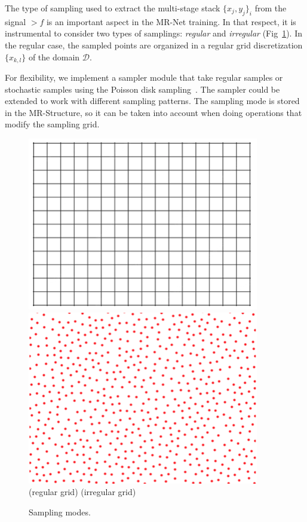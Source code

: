 The type of sampling used to extract the multi-stage stack $\{x_j, y_j\}_i$ from the signal $\gt{f}$ is an important aspect in the MR-Net training. In that respect, it is instrumental to consider two types of samplings: \textit{regular} and \textit{irregular} (Fig~\ref{f:sampling}). 
%
In the regular case, the sampled points are organized in a regular grid discretization $\{x_{k,l}\}$ of the domain $\mathcal{D}$. 

%
For flexibility, we implement a sampler module that take regular samples or stochastic samples using the Poisson disk sampling~\cite{stochastic_cook, poisson_bridson}. 
The sampler could be extended to work with different sampling patterns. 
The sampling mode is stored in the MR-Structure, so it can be taken into account when doing operations that modify the sampling grid.

\begin{figure}[!h]
\centering
\includegraphics[width=0.45\linewidth]{img/ch4/regular.png}
\hfil
\includegraphics[width=0.45\linewidth]{img/ch4/poisson.png}
\\
{\small\hfil (regular grid) \hfil\hfil\hfil (irregular grid) \hfil}
\vspace{-0.2cm}
\caption{Sampling modes.}
\label{f:sampling}
\end{figure}


